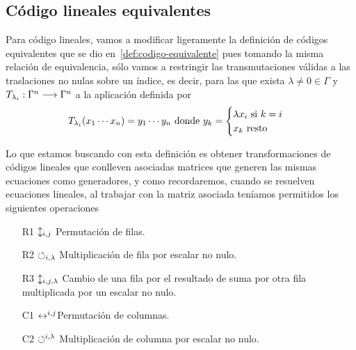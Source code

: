 \subsection{Código lineales equivalentes}
Para código lineales, vamos a modificar ligeramente la definición de códigos equivalentes que se dio en~\eqref{def:codigo-equivalente} pues tomando la misma relación de equivalencia, sólo vamos a restringir las transmutaciones válidas a las traslaciones no nulas sobre un índice, es decir, para las que exista $\lambda\neq 0\in\Gamma$ y $T_{\lambda_i}:\Gamma^n\longrightarrow \Gamma^n$ a la aplicación definida por
\[
	T_{\lambda_i}(x_1\cdots x_{n})=y_1\cdots y_n \text{ donde } y_k = \begin{cases}
		                                                            \lambda x_i \text{ si } k = i \\
		                                                            x_k \text{ resto}
	\end{cases}
\]

Lo que estamos buscando con esta definición es obtener transformaciones de códigos lineales que conlleven asociadas matrices que generen las mismas ecuaciones como generadores, y como recordaremos, cuando se resuelven ecuaciones lineales, al trabajar con la matriz asociada teníamos permitidos los siguientes operaciones
\begin{itemize}
	\item[R1] $\updownarrow_{i, j}$ Permutación de filas.
	\item[R2] $\circlearrowleft_{i, \lambda}$ Multiplicación de fila por escalar no nulo.
	\item[R3] $\updownarrow_{i, j, \lambda}$ Cambio de una fila por el resultado de suma por otra fila multiplicada por un escalar no nulo.
	\item[C1] $\leftrightarrow^{i, j}$Permutación de columnas.
	\item[C2] $\circlearrowleft^{i, \lambda}$ Multiplicación de columna por escalar no nulo.
\end{itemize}

